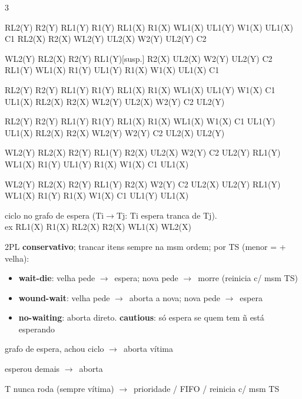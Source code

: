 \documentclass[a4paper]{article}
\newenvironment{dl}{\begin{description}[leftmargin=3.2mm,labelindent=0pt,itemsep=0.7pt,topsep=0.6pt,font=\color{tm}\bfseries,style=standard]}{\end{description}}
\newcommand{\h}[1]{\par\vspace{2.2pt}{\setlength{\fboxsep}{0.9pt}\colorbox{hd}{\parbox{\dimexpr\linewidth-1.8pt}{\color{white}\bfseries\ #1}}}\par\vspace{0.8pt}}
\newcommand{\CS}{{\color{cs}\bfseries conservativo}}
\newcommand{\ES}{{\color{es}\bfseries estrito}}
\newcommand{\RG}{{\color{rg}\bfseries rigoroso}}
\newcommand{\go}{$\rightarrow$}
\newcommand{\q}[1]{{\ttfamily #1}}
\begin{document}
\begin{multicols*}{3}
\begin{dl}
\item[simples:] \q{RL2(Y) R2(Y) RL1(Y) R1(Y) RL1(X) R1(X) WL1(X) UL1(Y) W1(X) UL1(X) C1 RL2(X) R2(X) WL2(Y) UL2(X) W2(Y) UL2(Y) C2}
\item[\CS:] \q{WL2(Y) RL2(X) R2(Y) RL1(Y)}[susp.] \q{R2(X) UL2(X) W2(Y) UL2(Y) C2 RL1(Y) WL1(X) R1(Y) UL1(Y) R1(X) W1(X) UL1(X) C1}
\item[\ES:] \q{RL2(Y) R2(Y) RL1(Y) R1(Y) RL1(X) R1(X) WL1(X) UL1(Y) W1(X) C1 UL1(X) RL2(X) R2(X) WL2(Y) UL2(X) W2(Y) C2 UL2(Y)}
\item[\RG:] \q{RL2(Y) R2(Y) RL1(Y) R1(Y) RL1(X) R1(X) WL1(X) W1(X) C1 UL1(Y) UL1(X) RL2(X) R2(X) WL2(Y) W2(Y) C2 UL2(X) UL2(Y)}
\item[conserv.+estr.:] \q{WL2(Y) RL2(X) R2(Y) RL1(Y) R2(X) UL2(X) W2(Y) C2 UL2(Y) RL1(Y) WL1(X) R1(Y) UL1(Y) R1(X) W1(X) C1 UL1(X)}
\item[conserv.+rig.:] \q{WL2(Y) RL2(X) R2(Y) RL1(Y) R2(X) W2(Y) C2 UL2(X) UL2(Y) RL1(Y) WL1(X) R1(Y) R1(X) W1(X) C1 UL1(Y) UL1(X)}
\end{dl}

\h{DEADLOCK / STARVATION}
\begin{dl}
\item[deadlock:] ciclo no grafo de espera (Ti\go Tj: Ti espera tranca de Tj).\\ ex \q{RL1(X) R1(X) RL2(X) R2(X) WL1(X) WL2(X)}
\item[prevenir:] 2PL \CS; trancar itens sempre na msm ordem; por TS (menor = + velha):
\begin{itemize}
\item \textbf{wait-die}: velha pede \go\ espera; nova pede \go\ morre (reinicia c/ msm TS)
\item \textbf{wound-wait}: velha pede \go\ aborta a nova; nova pede \go\ espera
\item \textbf{no-waiting}: aborta direto. \textbf{cautious}: só espera se quem tem ñ está esperando
\end{itemize}
\item[detectar:] grafo de espera, achou ciclo \go\ aborta vítima
\item[timeout:] esperou demais \go\ aborta
\item[starvation:] T nunca roda (sempre vítima) \go\ prioridade / FIFO / reinicia c/ msm TS
\end{dl}


\end{multicols*}
\end{document}
